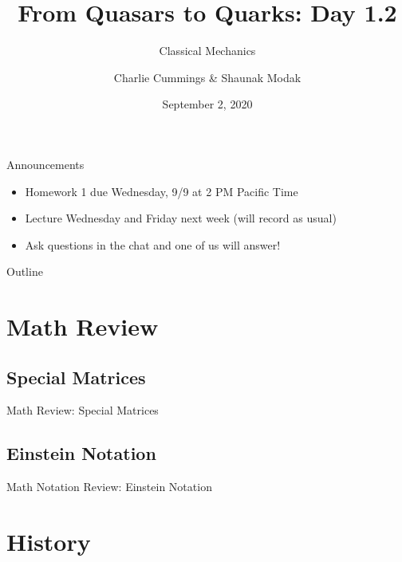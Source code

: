 \documentclass[10pt,xcolor={table,dvipsnames},t]{beamer}
\title[Your Short Title]{From Quasars to Quarks: Day 1.2}
\subtitle{Classical Mechanics}
\author{Charlie Cummings \& Shaunak Modak}
\institute{tinyurl.com/FQ2Q-mechanics}
\date{September 2, 2020}
\begin{document}
\begin{frame}
    \titlepage
\end{frame}

\begin{frame}{Announcements}
    \begin{itemize}
        \item Homework 1 due Wednesday, 9/9 at 2 PM Pacific Time
        \item Lecture Wednesday and Friday next week (will record as usual)
        \item Ask questions in the chat and one of us will answer!
    \end{itemize}
\end{frame}

\begin{frame}{Outline}
    \tableofcontents
\end{frame}

\section{Math Review}

\subsection{Special Matrices}

\begin{frame}{Math Review: Special Matrices}
\end{frame}

\subsection{Einstein Notation}

\begin{frame}{Math Notation Review: Einstein Notation}
\end{frame}

\section{History}
\end{document}
